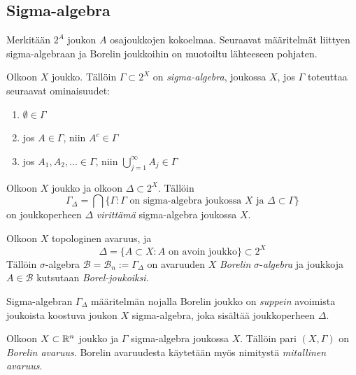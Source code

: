 \documentclass[12pt,oneside,a4paper]{amsbook} %
\begin{document}
\subsection{Sigma-algebra}
Merkitään $2^A$ joukon $A$ osajoukkojen kokoelmaa. Seuraavat määritelmät liittyen sigma-algebraan ja Borelin joukkoihin on muotoiltu lähteeseen \cite[s.86-87]{lehrbäck} pohjaten.

\begin{definition}
    Olkoon $X$ joukko. Tällöin $\Gamma \subset 2^X$ on \textit{sigma-algebra}, joukossa $X$, jos $\Gamma$ toteuttaa seuraavat ominaisuudet:
    \begin{enumerate}
        \item $\emptyset \in \Gamma$ 
        \item jos $A \in \Gamma$, niin $A^c \in \Gamma$
        \item jos $A_1, A_2, ... \in \Gamma$, niin $\bigcup_{j=1}^\infty A_j \in \Gamma$ 
    \end{enumerate}
\end{definition}


\begin{definition}
    Olkoon $X$ joukko ja olkoon $\Delta \subset 2^X$. Tällöin 
        $$ \Gamma_\Delta = \bigcap \{\Gamma : \Gamma \text{ on sigma-algebra joukossa } X \text{ ja }  \Delta \subset \Gamma \}$$ 
    on joukkoperheen $\Delta$ \textit{virittämä} sigma-algebra joukossa $X$.
\end{definition}

\begin{definition}
    Olkoon $X$ topologinen avaruus, ja 
    \[\Delta = \{A \subset X : A \text{ on avoin joukko}\} \subset 2^X \]
    Tällöin $\sigma$-algebra $\mathcal B = \mathcal B_n := \Gamma_\Delta$ on avaruuden $X$ \textit{Borelin} $\sigma$-\textit{algebra} ja joukkoja $A\in \mathcal B$ kutsutaan \textit{Borel-joukoiksi.} 
\end{definition}

Sigma-algebran $\Gamma_\Delta$ määritelmän nojalla Borelin joukko on \textit{suppein} avoimista joukoista koostuva joukon $X$ sigma-algebra, joka sisältää joukkoperheen $\Delta$.

\begin{definition}
    Olkoon $X\subset \mathbb{R}^n$ joukko ja $\Gamma$ sigma-algebra joukossa $X$. Tällöin pari $(X, \Gamma)$ on \textit{Borelin avaruus}. Borelin avaruudesta käytetään myös nimitystä \textit{mitallinen avaruus}.
\end{definition}
\end{document}
